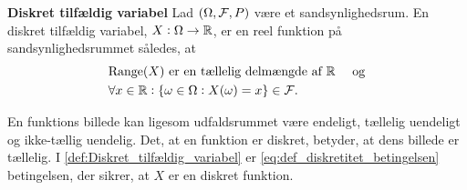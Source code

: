 
\begin{minipage}\textwidth
\begin{defn}\label{def:Diskret_tilfældig_variabel}\textbf{Diskret tilfældig variabel} %
\newline
Lad $(\Omega, \mathcal{F}, P)$ være et sandsynlighedsrum. En diskret tilfældig variabel, $X:\Omega \to \mathbb{R}$, er en reel funktion på sandsynlighedsrummet således, at
%
\begin{align}
    &\text{$\text{Range}(X)$ er en tællelig delmængde af $\R$ } \quad \text{og}\label{eq:def_diskretitet_betingelsen}\\
    &\forall x\in \R: \{\omega\in \Omega: X(\omega)=x\}\in %
    \F. \label{eq:def_tilfældig_variabel}
\end{align}

\end{defn}
\end{minipage}

En funktions billede kan ligesom udfaldsrummet være endeligt, tællelig uendeligt og ikke-tællig uendelig. Det, at en funktion er diskret, betyder, at dens billede er tællelig. 
I \autoref{def:Diskret_tilfældig_variabel} er
\eqref{eq:def_diskretitet_betingelsen} betingelsen, der sikrer, at $X$ er en diskret funktion.









